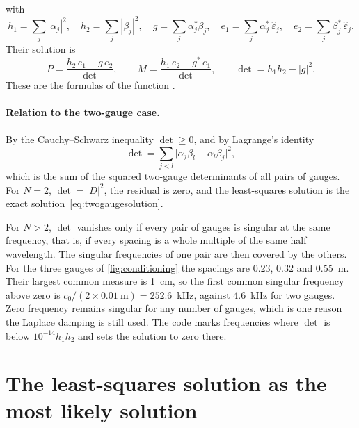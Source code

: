 \documentclass[11pt,a4paper,numbers=noenddot,abstract=true]{scrartcl}
\newcommand{\code}[1]{\texttt{\detokenize{#1}}}
\begin{document}
with
\begin{equation}
  h_1 = \sum_j |\alpha_j|^2, \quad h_2 = \sum_j |\beta_j|^2, \quad g = \sum_j \alpha_j^* \beta_j, \quad
  e_1 = \sum_j \alpha_j^*\, \hat\varepsilon_j, \quad e_2 = \sum_j \beta_j^*\, \hat\varepsilon_j.
\end{equation}
Their solution is
\begin{equation}
  P = \frac{h_2\, e_1 - g\, e_2}{\det}, \qquad
  M = \frac{h_1\, e_2 - g^*\, e_1}{\det}, \qquad
  \det = h_1 h_2 - |g|^2.
\end{equation}
These are the formulas of the function \code{separate_spectra}.

\paragraph{Relation to the two-gauge case.} By the Cauchy--Schwarz inequality $\det \ge 0$, and by Lagrange's
identity
\begin{equation}
  \det = \sum_{j < l} \bigl|\alpha_j \beta_l - \alpha_l \beta_j\bigr|^2,
  \label{eq:lagrange}
\end{equation}
which is the sum of the squared two-gauge determinants of all pairs of gauges. For $N = 2$, $\det = |D|^2$, the
residual is zero, and the least-squares solution is the exact solution~\eqref{eq:twogaugesolution}.

For $N > 2$, $\det$ vanishes only if every pair of gauges is singular at the same frequency, that is, if every
spacing is a whole multiple of the same half wavelength. The singular frequencies of one pair are then covered by
the others. For the three gauges of \cref{fig:conditioning} the spacings are 0.23, 0.32 and 0.55~m. Their largest
common measure is 1~cm, so the first common singular frequency above zero is $c_0 / (2 \times 0.01~\mathrm{m})
= 252.6$~kHz, against 4.6~kHz for two gauges. Zero frequency remains singular for any number of gauges, which is
one reason the Laplace damping is still used. The code marks frequencies where $\det$ is below $10^{-14} h_1 h_2$
and sets the solution to zero there.

\section{The least-squares solution as the most likely solution}
\label{sec:likely}
\end{document}

